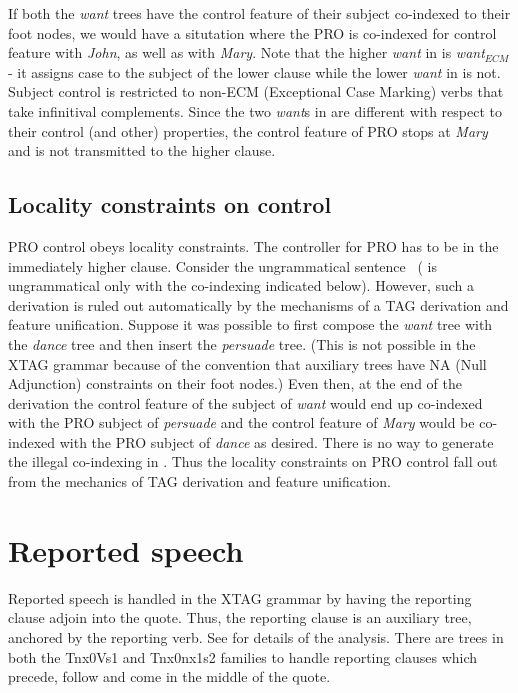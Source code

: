 
If both the {\it want} trees have the control feature of their subject
co-indexed to their foot nodes, we would have a situtation where
the PRO is co-indexed for control feature with {\it John}, as well as with {\it Mary}. 
Note that the higher {\it want} in  is {\em want$_{ECM}$} 
- it assigns case
to the subject of the lower clause while the lower {\it want} in  is 
not. Subject control is restricted
to non-ECM (Exceptional Case Marking) verbs that take infinitival 
complements. Since the two {\it want}s in  are different with
respect to their control (and other) properties, the control feature
of PRO stops at {\it Mary} and is not transmitted to the higher clause.


\subsection{Locality constraints on control}
PRO control obeys locality constraints. The controller for PRO has to be
in the immediately higher clause. Consider the ungrammatical sentence~
( is ungrammatical only with the co-indexing indicated below).
However, such a derivation is ruled out automatically by the 
mechanisms of a TAG derivation and feature unification. 
Suppose it was possible to first compose the {\em want} tree with the
{\em dance} tree and then insert the {\em persuade} tree. (This is not
possible in the XTAG grammar because of the convention that
auxiliary trees have NA (Null Adjunction) constraints on their foot nodes.)
Even then, at the end of the derivation the control feature of the 
subject of {\em want} would end up co-indexed with the PRO subject of
{\em persuade} and the control feature of {\em Mary} would be co-indexed with the
PRO subject of {\em dance} as desired. There is no way to generate the illegal
co-indexing in . Thus the locality constraints on PRO control 
fall out from the mechanics of TAG derivation and feature unification. 



\section{Reported speech}

Reported speech is handled in the XTAG grammar by having the reporting
clause adjoin into the quote. Thus, the reporting clause is an
auxiliary tree, anchored by the reporting verb. See \cite{doran-diss}
for details of the analysis. There are trees in both the Tnx0Vs1 and
Tnx0nx1s2 families to handle reporting clauses which precede, follow
and come in the middle of the quote.

